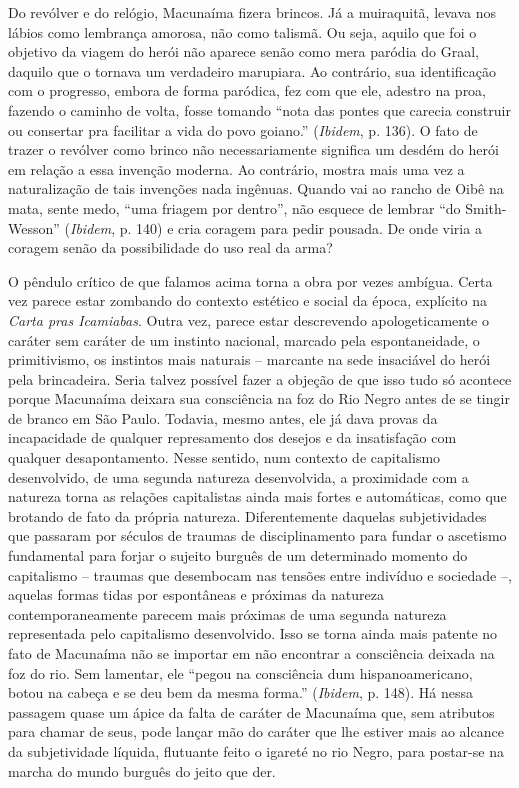 Do revólver e do relógio, Macunaíma fizera brincos. Já a muiraquitã,
levava nos lábios como lembrança amorosa, não como talismã. Ou seja,
aquilo que foi o objetivo da viagem do herói não aparece senão como mera
paródia do Graal, daquilo que o tornava um verdadeiro marupiara. Ao
contrário, sua identificação com o progresso, embora de forma paródica,
fez com que ele, adestro na proa, fazendo o caminho de volta, fosse
tomando ``nota das pontes que carecia construir ou consertar pra
facilitar a vida do povo goiano.'' (\emph{Ibidem}, p. 136). O fato de
trazer o revólver como brinco não necessariamente significa um desdém do
herói em relação a essa invenção moderna. Ao contrário, mostra mais uma
vez a naturalização de tais invenções nada ingênuas. Quando vai ao
rancho de Oibê na mata, sente medo, ``uma friagem por dentro'', não
esquece de lembrar ``do Smith-Wesson'' (\emph{Ibidem}, p. 140) e cria
coragem para pedir pousada. De onde viria a coragem senão da
possibilidade do uso real da arma?

O pêndulo crítico de que falamos acima torna a obra por vezes ambígua.
Certa vez parece estar zombando do contexto estético e social da época,
explícito na \emph{Carta pras Icamiabas}. Outra vez, parece estar
descrevendo apologeticamente o caráter sem caráter de um instinto
nacional, marcado pela espontaneidade, o primitivismo, os instintos mais
naturais -- marcante na sede insaciável do herói pela brincadeira. Seria
talvez possível fazer a objeção de que isso tudo só acontece porque
Macunaíma deixara sua consciência na foz do Rio Negro antes de se tingir
de branco em São Paulo. Todavia, mesmo antes, ele já dava provas da
incapacidade de qualquer represamento dos desejos e da insatisfação com
qualquer desapontamento. Nesse sentido, num contexto de capitalismo
desenvolvido, de uma segunda natureza desenvolvida, a proximidade com a
natureza torna as relações capitalistas ainda mais fortes e automáticas,
como que brotando de fato da própria natureza. Diferentemente daquelas
subjetividades que passaram por séculos de traumas de disciplinamento
para fundar o ascetismo fundamental para forjar o sujeito burguês de um
determinado momento do capitalismo -- traumas que desembocam nas tensões
entre indivíduo e sociedade --, aquelas formas tidas por espontâneas e
próximas da natureza contemporaneamente parecem mais próximas de uma
segunda natureza representada pelo capitalismo desenvolvido. Isso se
torna ainda mais patente no fato de Macunaíma não se importar em não
encontrar a consciência deixada na foz do rio. Sem lamentar, ele ``pegou
na consciência dum hispanoamericano, botou na cabeça e se deu bem da
mesma forma.'' (\emph{Ibidem}, p. 148). Há nessa passagem quase um ápice
da falta de caráter de Macunaíma que, sem atributos para chamar de seus,
pode lançar mão do caráter que lhe estiver mais ao alcance da
subjetividade líquida, flutuante feito o igareté no rio Negro, para
postar-se na marcha do mundo burguês do jeito que der.

